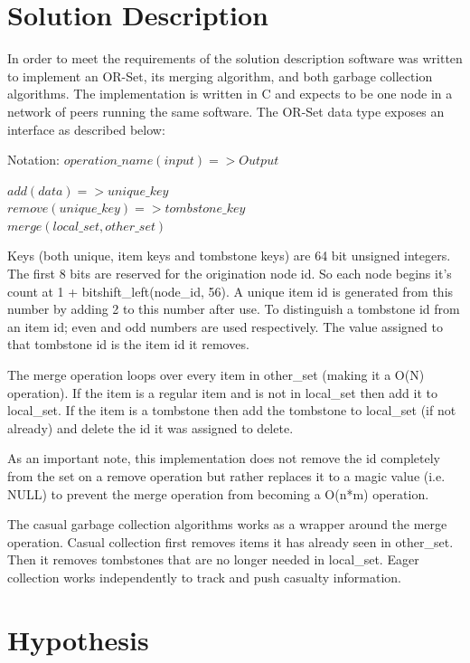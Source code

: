 \documentclass{article}
\begin{document}
\begin{multicols}{2}
\begin{refsection}
\section*{Solution Description}

In order to meet the requirements of the solution description software
was written to implement an OR-Set, its merging algorithm, and both
garbage collection algorithms. The implementation is written in C and
expects to be one node in a network of peers running the same software.
The OR-Set data type exposes an interface as described below:

Notation:
$ operation\_name(input) => Output $

$ add(data) => unique\_key $ \\
$ remove(unique\_key) => tombstone\_key $ \\
$ merge(local\_set, other\_set) $

Keys (both unique, item keys and tombstone keys) are 64 bit unsigned
integers. The first 8 bits are reserved for the origination node id. So
each node begins it's count at 1 + bitshift\_left(node\_id, 56). A unique item id is
generated from this number by adding 2 to this number after use. To
distinguish a tombstone id from an item id; even and odd numbers are
used respectively. The value assigned to that tombstone id is the item
id it removes.

The merge operation loops over every item in other\_set (making it a
O(N) operation). If the item is a regular item and is not in local\_set
then add it to local\_set. If the item is a tombstone then add the
tombstone to local\_set (if not already) and delete the id it was
assigned to delete.

As an important note, this implementation does not remove the id
completely from the set on a remove operation but rather replaces it to
a magic value (i.e. NULL) to prevent the merge operation from becoming
a O(n*m) operation.

The casual garbage collection algorithms works as a wrapper around the merge
operation. Casual collection first removes items it has already seen in
other\_set. Then it removes tombstones that are no longer needed in
local\_set. Eager collection works independently to track and push
casualty information.

\section*{Hypothesis}


\end{refsection}
\end{multicols}
\end{document}

